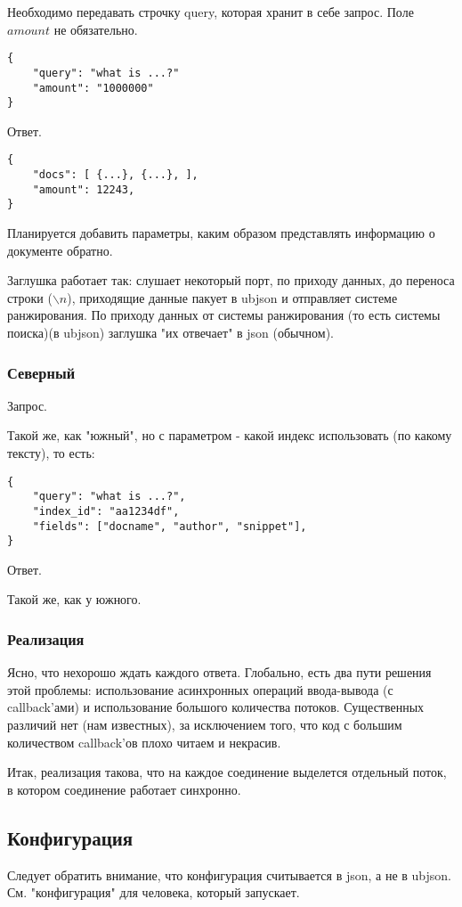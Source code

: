 \documentclass[12pt,a4paper]{article}
\begin{document}
Необходимо передавать строчку query, которая хранит в себе запрос.
Поле $amount$ не обязательно.
\begin{verbatim}
{
	"query": "what is ...?"
	"amount": "1000000"
}
\end{verbatim}

Ответ.

\begin{verbatim}
{
	"docs": [ {...}, {...}, ],
	"amount": 12243,
}
\end{verbatim}


Планируется добавить параметры, каким образом представлять информацию о документе обратно.

Заглушка работает так: слушает некоторый порт, по приходу данных, до переноса строки ($\backslash n$), приходящие данные пакует в ubjson и отправляет системе ранжирования. По приходу данных от системы ранжирования (то есть системы поиска)(в ubjson) заглушка "их отвечает" в json (обычном).

\subsubsection{Северный}
Запрос.

Такой же, как "южный", но с параметром - какой индекс использовать (по какому тексту), то есть:
\begin{verbatim}
{
	"query": "what is ...?",
	"index_id": "aa1234df",
	"fields": ["docname", "author", "snippet"],
}
\end{verbatim}

Ответ.

Такой же, как у южного. 

\subsubsection{Реализация}
Ясно, что нехорошо ждать каждого ответа. 
Глобально, есть два пути решения этой проблемы: использование асинхронных операций ввода-вывода (с callback'ами) и использование большого количества потоков. Существенных различий нет (нам известных), за исключением того, что код с большим количеством callback'ов плохо читаем и некрасив.

Итак, реализация такова, что на каждое соединение выделется отдельный поток, в котором соединение работает синхронно.

\subsection{Конфигурация}
Следует обратить внимание, что конфигурация считывается в json, а не в ubjson.
См. "конфигурация" для человека, который запускает.
\end{document}

